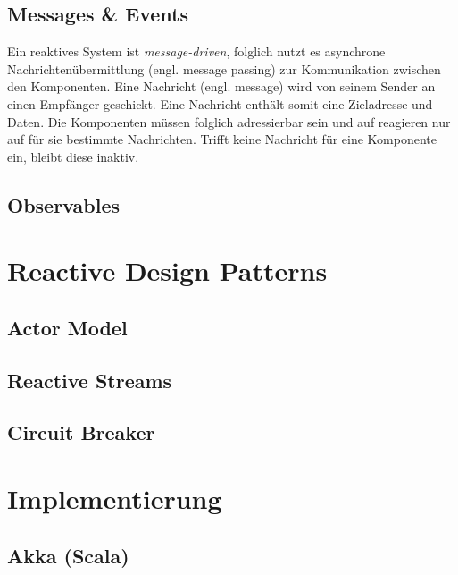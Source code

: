 \subsection{Messages \& Events}
Ein reaktives System ist \textit{message-driven}, folglich nutzt es asynchrone Nachrichtenübermittlung (engl. message passing) zur Kommunikation zwischen den Komponenten. Eine Nachricht (engl. message) wird von seinem Sender an einen Empfänger geschickt. Eine Nachricht enthält somit eine Zieladresse und Daten. Die Komponenten müssen folglich adressierbar sein und auf reagieren nur auf für sie bestimmte Nachrichten. Trifft keine Nachricht für eine Komponente ein, bleibt diese inaktiv.



\subsection{Observables}

\pagebreak

\section{Reactive Design Patterns}
\subsection{Actor Model}
\subsection{Reactive Streams}
\subsection{Circuit Breaker}

\section{Implementierung}
\subsection{Akka (Scala)}

